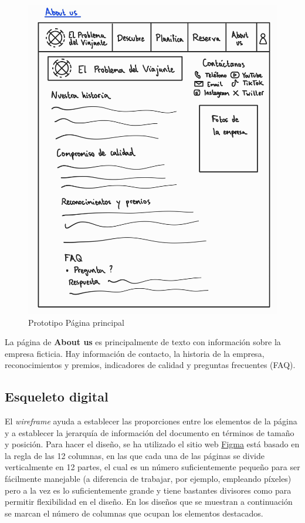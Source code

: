 \documentclass[11pt, a4paper]{book}
\begin{document}
	\begin{figure} [H]
		\centering
		\includegraphics[width=\textwidth]{5-about_us.jpg}
		\caption{Prototipo Página principal}
	\end{figure} 

	La página de \textbf{About us} es principalmente de texto con información sobre la empresa ficticia. Hay información de contacto, la historia de la empresa, reconocimientos y premios, indicadores de calidad y preguntas frecuentes (FAQ).
	
	\newpage
	
	\subsection{Esqueleto digital}
	El \textit{wireframe} ayuda a establecer las proporciones entre los elementos de la página y a establecer la jerarquía de información del documento en términos de tamaño y posición. Para hacer el diseño, se ha utilizado el sitio web \href{https://figma.com}{Figma} está basado en la regla de las 12 columnas, en las que cada una de las páginas se divide verticalmente en 12 partes, el cual es un número suficientemente pequeño para ser fácilmente manejable (a diferencia de trabajar, por ejemplo, empleando píxeles) pero a la vez es lo suficientemente grande y tiene bastantes divisores como para permitir flexibilidad en el diseño. En los diseños que se muestran a continuación se marcan el número de columnas que ocupan los elementos destacados.
	
\end{document}
